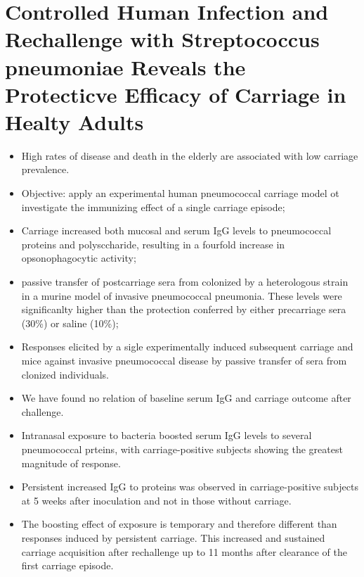 \documentclass[
]{book}
\begin{document}
\hypertarget{controlled-human-infection-and-rechallenge-with-streptococcus-pneumoniae-reveals-the-protecticve-efficacy-of-carriage-in-healty-adults}{%
\section{Controlled Human Infection and Rechallenge with Streptococcus pneumoniae Reveals the Protecticve Efficacy of Carriage in Healty Adults}\label{controlled-human-infection-and-rechallenge-with-streptococcus-pneumoniae-reveals-the-protecticve-efficacy-of-carriage-in-healty-adults}}

\begin{itemize}
\item
  High rates of disease and death in the elderly are associated with low carriage prevalence.
\item
  Objective: apply an experimental human pneumococcal carriage model ot investigate the immunizing effect of a single carriage episode;
\item
  Carriage increased both mucosal and serum IgG levels to pneumococcal proteins and polysccharide, resulting in a fourfold increase in opsonophagocytic activity;
\item
  passive transfer of postcarriage sera from colonized by a heterologous strain in a murine model of invasive pneumococcal pneumonia. These levels were significanlty higher than the protection conferred by either precarriage sera (30\%) or saline (10\%);
\item
  Responses elicited by a sigle experimentally induced subsequent carriage and mice against invasive pneumococcal disease by passive transfer of sera from clonized individuals.
\item
  We have found no relation of baseline serum IgG and carriage outcome after challenge.
\item
  Intranasal exposure to bacteria boosted serum IgG levels to several pneumococcal prteins, with carriage-positive subjects showing the greatest magnitude of response.
\item
  Persistent increased IgG to proteins was observed in carriage-positive subjects at 5 weeks after inoculation and not in those without carriage.
\item
  The boosting effect of exposure is temporary and therefore different than responses induced by persistent carriage. This increased and sustained carriage acquisition after rechallenge up to 11 months after clearance of the first carriage episode.
\end{itemize}
\end{document}
